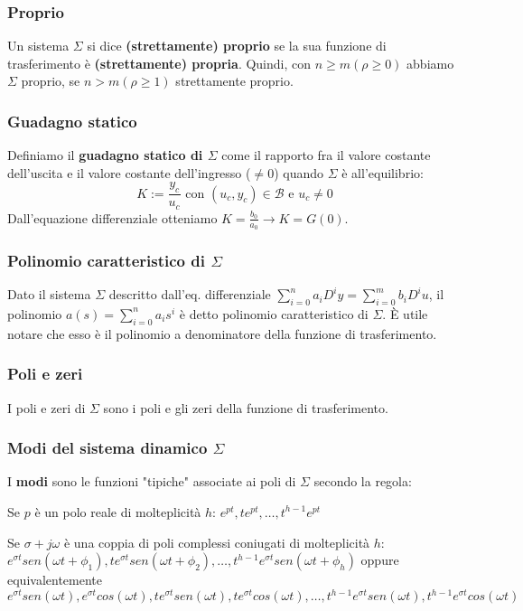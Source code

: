 \documentclass[11pt]{article}
\begin{document}
\subsubsection{Proprio}
Un sistema $\Sigma$ si dice \textbf{(strettamente) proprio} se la sua funzione di trasferimento è \textbf{(strettamente) propria}. Quindi, con $n\ge m (\rho \ge 0)$ abbiamo $\Sigma$ proprio, se $n>m (\rho\ge1)$ strettamente proprio.
\subsubsection{Guadagno statico}
Definiamo il \textbf{guadagno statico di $\Sigma$} come il rapporto fra il valore costante dell'uscita e il valore costante dell'ingresso ($\neq 0$) quando $\Sigma$ è all'equilibrio:
\begin{displaymath}
    K := \frac{y_c}{u_c} \textrm{ con } (u_c, y_c) \in \mathcal{B} \textrm{ e }u_c \neq 0
\end{displaymath}
Dall'equazione differenziale otteniamo $K=\frac{b_0}{a_0} \rightarrow K=G(0)$.
\subsubsection{Polinomio caratteristico di $\Sigma$}
Dato il sistema $\Sigma$ descritto dall'eq. differenziale $\sum_{i=0}^n a_i D^i y = \sum_{i=0}^m b_i D^i u$, il polinomio $a(s)= \sum_{i=0}^n a_i s^i$ è detto polinomio caratteristico di $\Sigma$. È utile notare che esso è il polinomio a denominatore della funzione di trasferimento.
\subsubsection{Poli e zeri}
I poli e zeri di $\Sigma$ sono i poli e gli zeri della funzione di trasferimento.
\subsubsection{Modi del sistema dinamico $\Sigma$}
I \textbf{modi} sono le funzioni  "tipiche" associate ai poli di $\Sigma$ secondo la regola:
\begin{center}
    Se $p$ è un polo reale di molteplicità $h$: $e^{pt}, te^{pt},\dots, t^{h-1}e^{pt}$
\end{center}
\begin{center}
    Se $\sigma+j\omega$ è una coppia di poli complessi coniugati di molteplicità $h$: $e^{\sigma t} sen(\omega t+\phi_1), te^{\sigma t} sen(\omega t+\phi_2),\dots, t^{h-1}e^{\sigma t} sen(\omega t+\phi_h)$ oppure equivalentemente $e^{\sigma t} sen(\omega t), e^{\sigma t} cos(\omega t), te^{\sigma t} sen(\omega t), te^{\sigma t} cos(\omega t),\dots, t^{h-1}e^{\sigma t} sen(\omega t), t^{h-1} e^{\sigma t} cos(\omega t)$
\end{center}
\end{document}
